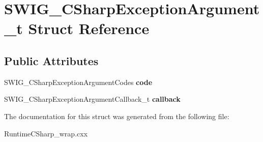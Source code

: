 \hypertarget{struct_s_w_i_g___c_sharp_exception_argument__t}{}\section{S\+W\+I\+G\+\_\+\+C\+Sharp\+Exception\+Argument\+\_\+t Struct Reference}
\label{struct_s_w_i_g___c_sharp_exception_argument__t}
\subsection*{Public Attributes}
\begin{DoxyCompactItemize}
\item 
\hypertarget{struct_s_w_i_g___c_sharp_exception_argument__t_a8c87eccaa5242cbf10a00e9571fc9208}{}\label{struct_s_w_i_g___c_sharp_exception_argument__t_a8c87eccaa5242cbf10a00e9571fc9208} 
S\+W\+I\+G\+\_\+\+C\+Sharp\+Exception\+Argument\+Codes {\bfseries code}
\item 
\hypertarget{struct_s_w_i_g___c_sharp_exception_argument__t_a1ce5e3abc49f6350a17b9fcfd990b321}{}\label{struct_s_w_i_g___c_sharp_exception_argument__t_a1ce5e3abc49f6350a17b9fcfd990b321} 
S\+W\+I\+G\+\_\+\+C\+Sharp\+Exception\+Argument\+Callback\+\_\+t {\bfseries callback}
\end{DoxyCompactItemize}


The documentation for this struct was generated from the following file\+:\begin{DoxyCompactItemize}
\item 
Runtime\+C\+Sharp\+\_\+wrap.\+cxx\end{DoxyCompactItemize}
